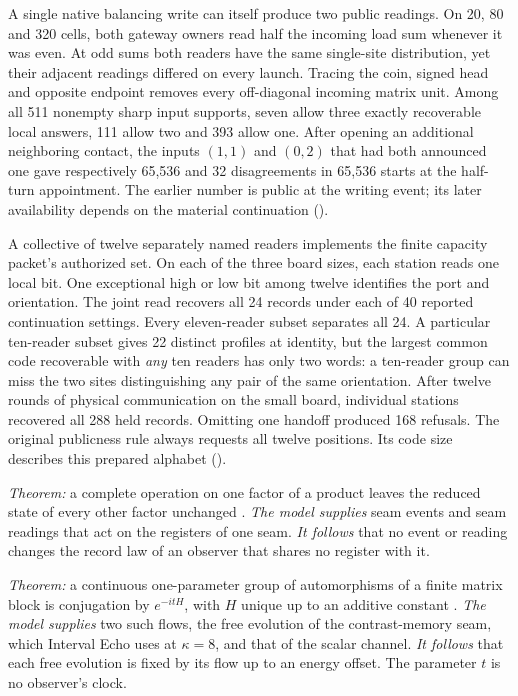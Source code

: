 \documentclass[11pt]{article}
\theoremstyle{definition}
\theoremstyle{remark}
\theoremstyle{plain}
\begin{document}
\begin{description}[leftmargin=1.2em,itemsep=3pt]
A single native balancing write can itself produce two public readings.
On 20, 80 and 320 cells, both gateway owners read half the incoming
load sum whenever it was even. At odd sums both readers have the same
single-site distribution, yet their adjacent readings differed on every
launch. Tracing the coin, signed head and opposite endpoint removes
every off-diagonal incoming matrix unit. Among all 511 nonempty sharp
input supports, seven allow three exactly recoverable local answers,
111 allow two and 393 allow one. After opening an additional neighboring
contact, the inputs $(1,1)$ and $(0,2)$ that had both announced one
gave respectively 65,536 and 32 disagreements in 65,536 starts at the
half-turn appointment. The earlier number is public at the writing
event; its later availability depends on the material continuation
().

A collective of twelve separately named readers implements the
finite capacity packet's authorized set. On each of the three board
sizes, each station reads one local bit. One exceptional high or low
bit among twelve identifies the port and orientation. The joint read
recovers all 24 records under each of 40 reported continuation settings.
Every eleven-reader subset separates all 24. A particular ten-reader
subset gives 22 distinct profiles at identity, but the largest common
code recoverable with \emph{any} ten readers has only two words:
a ten-reader group can miss the two sites distinguishing any pair of
the same orientation. After twelve rounds of physical communication on
the small board, individual stations recovered all 288 held records.
Omitting one handoff produced 168 refusals. The original publicness
rule always requests all twelve positions. Its code size describes this
prepared alphabet ().

\item[Local operations.] \emph{Theorem:} a complete operation on one
factor of a product leaves the reduced state of every other factor
unchanged \cite{ophconsensus}. \emph{The model supplies} seam events and
seam readings that act on the registers of one seam. \emph{It follows} that
no event or reading changes the record law of an observer that shares no
register with it.

\item[The generator.] \emph{Theorem:} a continuous one-parameter group of
automorphisms of a finite matrix block is conjugation by $e^{-itH}$, with
$H$ unique up to an additive constant \cite{ophobservers}. \emph{The model
supplies} two such flows, the free evolution of the contrast-memory seam,
which Interval Echo uses at $\kappa=8$, and that of the scalar channel.
\emph{It follows} that each free evolution is fixed by its flow up to an
energy offset. The parameter $t$ is no observer's clock.


\end{description}
\end{document}
